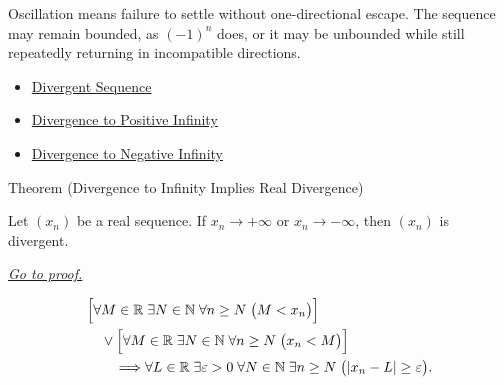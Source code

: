 \begin{remark*}[Interpretation]
Oscillation means failure to settle without one-directional escape. The
sequence may remain bounded, as $(-1)^n$ does, or it may be unbounded while
still repeatedly returning in incompatible directions.
\end{remark*}

\begin{dependencies}
\begin{itemize}
  \item \hyperref[def:divergent-sequence]{Divergent Sequence}
  \item \hyperref[def:diverges-to-positive-infinity]{Divergence to Positive Infinity}
  \item \hyperref[def:diverges-to-negative-infinity]{Divergence to Negative Infinity}
\end{itemize}
\end{dependencies}


\begin{theorembox}{Theorem (Divergence to Infinity Implies Real Divergence)}
\begin{theorem}
\label{thm:divergence-to-infinity-implies-real-divergence}
Let $(x_n)$ be a real sequence. If $x_n\to+\infty$ or $x_n\to-\infty$,
then $(x_n)$ is divergent.

\smallskip
\noindent
\hyperref[prf:divergence-to-infinity-implies-real-divergence]{\textit{Go to proof.}}
\end{theorem}
\end{theorembox}

\begin{remark*}
\[
\begin{aligned}
&\Bigl[
  \forall M\in\mathbb{R}\;\exists N\in\mathbb{N}\;\forall n\ge N
  \;\bigl(M<x_n\bigr)
\Bigr]\\
&\quad\lor
\Bigl[
  \forall M\in\mathbb{R}\;\exists N\in\mathbb{N}\;\forall n\ge N
  \;\bigl(x_n<M\bigr)
\Bigr]\\
&\qquad\Longrightarrow
\forall L\in\mathbb{R}\;\exists \varepsilon>0\;\forall N\in\mathbb{N}
\;\exists n\ge N\;\bigl(|x_n-L|\ge\varepsilon\bigr).
\end{aligned}
\]
\end{remark*}

